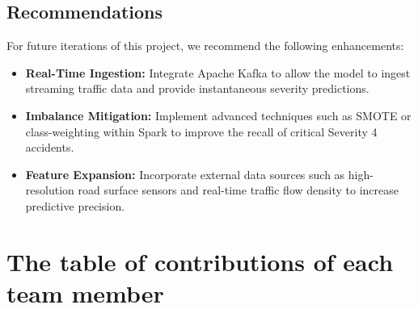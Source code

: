 \documentclass[11pt,a4paper]{article}
\begin{document}
\subsection*{Recommendations}
For future iterations of this project, we recommend the following enhancements:
\begin{itemize}
    \item \textbf{Real-Time Ingestion:} Integrate Apache Kafka to allow the model to ingest streaming traffic data and provide instantaneous severity predictions.
    \item \textbf{Imbalance Mitigation:} Implement advanced techniques such as SMOTE or class-weighting within Spark to improve the recall of critical Severity 4 accidents.
    \item \textbf{Feature Expansion:} Incorporate external data sources such as high-resolution road surface sensors and real-time traffic flow density to increase predictive precision.
\end{itemize}

\section*{The table of contributions of each team member}

\vspace{0.8em}
\scriptsize %
\setlength{\tabcolsep}{2pt} %
\renewcommand{\arraystretch}{1.5}
\end{document}
